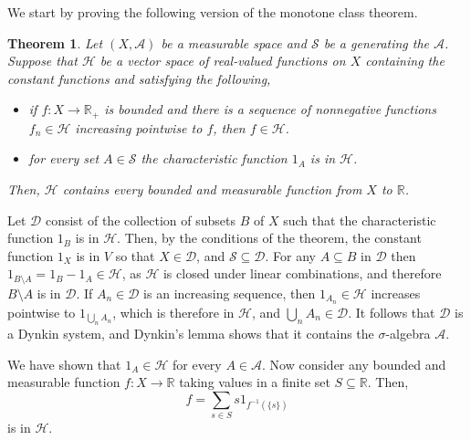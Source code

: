 \documentclass[12pt]{article}
\newtheorem{theorem}{Theorem}
\begin{document}

We start by proving the following version of the monotone class theorem.

\begin{theorem}\label{thm:1}
Let $(X,\mathcal{A})$ be a measurable space and $\mathcal{S}$ be a  generating the  $\mathcal{A}$.
Suppose that $\mathcal{H}$ be a vector space of real-valued functions on $X$ containing the constant functions and satisfying the following,
\begin{itemize}
\item if $f\colon X\rightarrow\mathbb{R}_+$ is bounded and there is a sequence of nonnegative functions $f_n\in \mathcal{H}$ increasing pointwise to $f$, then $f\in \mathcal{H}$.
\item for every set $A\in\mathcal{S}$ the characteristic function $1_A$ is in $\mathcal{H}$.
\end{itemize}
Then, $\mathcal{H}$ contains every bounded and measurable function from $X$ to $\mathbb{R}$.
\end{theorem}


Let $\mathcal{D}$ consist of the collection of subsets $B$ of $X$ such that the characteristic function $1_B$ is in $\mathcal{H}$. Then, by the conditions of the theorem, the constant function $1_X$ is in $V$ so that $X\in\mathcal{D}$, and $\mathcal{S}\subseteq\mathcal{D}$. For any $A\subseteq B$ in $\mathcal{D}$ then $1_{B\setminus A}=1_B-1_A\in \mathcal{H}$, as $\mathcal{H}$ is closed under linear combinations, and therefore $B\setminus A$ is in $\mathcal{D}$.
If $A_n\in\mathcal{D}$ is an increasing sequence, then $1_{A_n}\in \mathcal{H}$ increases pointwise to $1_{\bigcup_nA_n}$, which is therefore in $\mathcal{H}$, and $\bigcup_nA_n\in\mathcal{D}$. It follows that $\mathcal{D}$ is a Dynkin system, and Dynkin's lemma shows that it contains the $\sigma$-algebra $\mathcal{A}$.

We have shown that $1_A\in \mathcal{H}$ for every $A\in\mathcal{A}$. Now consider any bounded and measurable function $f\colon X\rightarrow\mathbb{R}$ taking values in a finite set $S\subseteq\mathbb{R}$. Then,
\begin{equation*}
f=\sum_{s\in S} s1_{f^{-1}(\{s\})}
\end{equation*}
is in $\mathcal{H}$.
\end{document}
